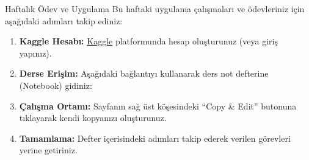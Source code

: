 % 


\begin{frame}{Haftalık Ödev ve Uygulama}
    \justifying{}
    Bu haftaki uygulama çalışmaları ve ödevleriniz için aşağıdaki adımları takip ediniz:

    \vspace{1em}
    \begin{enumerate}
        \item \textbf{Kaggle Hesabı:} \href{https://www.kaggle.com}{Kaggle} platformunda hesap oluşturunuz (veya giriş yapınız).

        \item \textbf{Derse Erişim:} Aşağıdaki bağlantıyı kullanarak ders not defterine (Notebook) gidiniz:
              \vspace{0.5em}
              \begin{center}
              \end{center}
              \vspace{0.5em}

        \item \textbf{Çalışma Ortamı:} Sayfanın sağ üst köşesindeki ``Copy \& Edit'' butonuna tıklayarak kendi kopyanızı oluşturunuz.

        \item \textbf{Tamamlama:} Defter içerisindeki adımları takip ederek verilen görevleri yerine getiriniz.
    \end{enumerate}
\end{frame}
